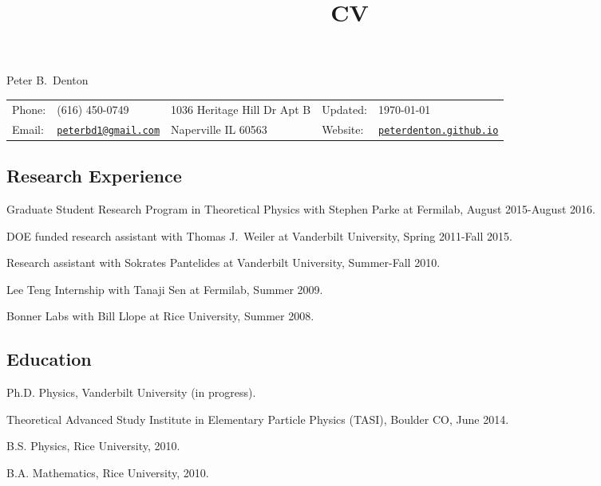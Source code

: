 \documentclass[letterpaper]{article}
\title{CV}
\newif\ifhtlatex
\def\name{Peter B.~Denton}
\renewenvironment{itemize}{
\begin{list}{}{
\setlength{\leftmargin}{1.5em}
}
}{
\end{list}
}
\begin{document}
\ifhtlatex
\Tag{TITLE+}{CV}
\fi

{\huge \name}

\vspace{0.1in}

\begin{tabular}{ll|l|ll}
Phone: & (616) 450-0749 & 1036 Heritage Hill Dr Apt B & Updated: & \today\\
Email: & \href{mailto:peterbd1@gmail.com}{\tt peterbd1@gmail.com} & Naperville IL 60563 & Website: & 
\href{http://peterdenton.github.io}{\tt peterdenton.github.io}
\end{tabular}

\subsection*{Research Experience}
\begin{itemize}
\item Graduate Student Research Program in Theoretical Physics with Stephen Parke at Fermilab, August 2015-August 2016.
\item DOE funded research assistant with Thomas J.~Weiler at Vanderbilt University, Spring 2011-Fall 2015.
\item Research assistant with Sokrates Pantelides at Vanderbilt University, Summer-Fall 2010.
\item Lee Teng Internship with Tanaji Sen at Fermilab, Summer 2009.
\item Bonner Labs with Bill Llope at Rice University, Summer 2008.
\end{itemize}

\subsection*{Education}
\begin{itemize}
\item Ph.D. Physics, Vanderbilt University (in progress).
\item Theoretical Advanced Study Institute in Elementary Particle Physics (TASI), Boulder CO, June 2014.
\item B.S. Physics, Rice University, 2010.
\item B.A. Mathematics, Rice University, 2010.
\end{itemize}
\end{document}
